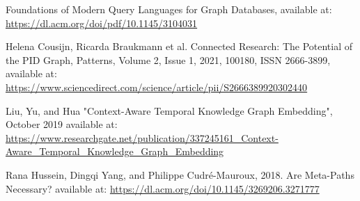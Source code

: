 \documentclass[conference]{IEEEtran}
\begin{document}
\begin{thebibliography}{00}
 Foundations of Modern Query Languages for Graph Databases, available at: \url{https://dl.acm.org/doi/pdf/10.1145/3104031}

 Helena Cousijn, Ricarda Braukmann et al. Connected Research: The Potential of the PID Graph, Patterns, Volume 2, Issue 1, 2021, 100180, ISSN 2666-3899, available at: \url{https://www.sciencedirect.com/science/article/pii/S2666389920302440}

Liu, Yu, and Hua "Context-Aware Temporal Knowledge Graph Embedding", October 2019
available at: \url{https://www.researchgate.net/publication/337245161_Context-Aware_Temporal_Knowledge_Graph_Embedding}

Rana Hussein, Dingqi Yang, and Philippe Cudré-Mauroux, 2018. Are Meta-Paths Necessary? available at: \url{https://dl.acm.org/doi/10.1145/3269206.3271777}



\end{thebibliography}
\end{document}
